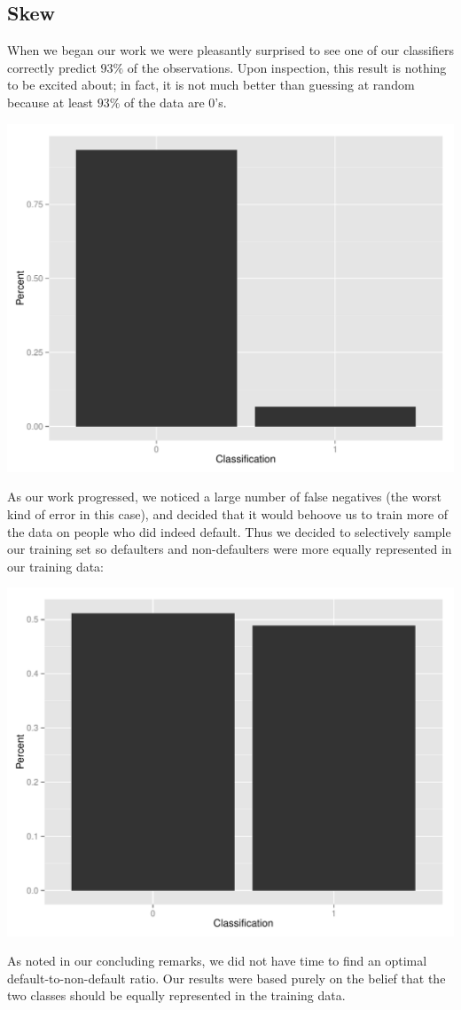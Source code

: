 \documentclass[11pt, oneside]{article}   	%
\begin{document}
	\subsection{Skew}
	When we began our work we were pleasantly surprised to see
	one of our classifiers correctly predict $93\%$ of the observations. Upon inspection,
	this result is nothing to be excited about; in fact, it is not much better than guessing at 
	random because at least $93\%$ of the data are $0$'s.
	\begin{center}
	\includegraphics[scale=0.5]{skew}
	\end{center}  
	As our work progressed, we noticed a large number of false negatives (the worst kind of error in this case), and decided that it would behoove us to train more of the data on people who did indeed default. Thus we decided to selectively
	sample our training set so defaulters and non-defaulters were more equally represented
	in our training data:
	\begin{center}
	\includegraphics[scale=0.5]{less_skew}
	\end{center}
	As noted in our concluding remarks, we did not have time to find an optimal default-to-non-default
	ratio. Our results were based purely on the belief that the two classes should be equally
	represented in the training data.
	
\end{document}
